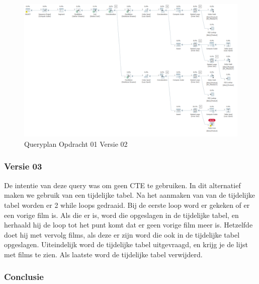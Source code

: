 
\begin{figure}
    \centering
    \includegraphics[width=1\textwidth]{image/joey/opdracht-01.PNG}
    \caption{Queryplan Opdracht 01 Versie 02}
\end{figure}


\subsubsection{Versie 03}

    De intentie van deze query was om geen CTE te gebruiken. In dit alternatief maken we gebruik van een tijdelijke tabel.
    Na het aanmaken van van de tijdelijke tabel worden er 2 while loops gedraaid. Bij de eerste loop word er gekeken of er een vorige film is.
    Als die er is, word die opgeslagen in de tijdelijke tabel, en herhaald hij de loop tot het punt komt dat er geen vorige film meer is.
    Hetzelfde doet hij met vervolg films, als deze er zijn word die ook in de tijdelijke tabel opgeslagen.
    Uiteindelijk word de tijdelijke tabel uitgevraagd, en krijg je de lijst met films te zien.
    Als laatste word de tijdelijke tabel verwijderd.



\subsubsection{Conclusie}

